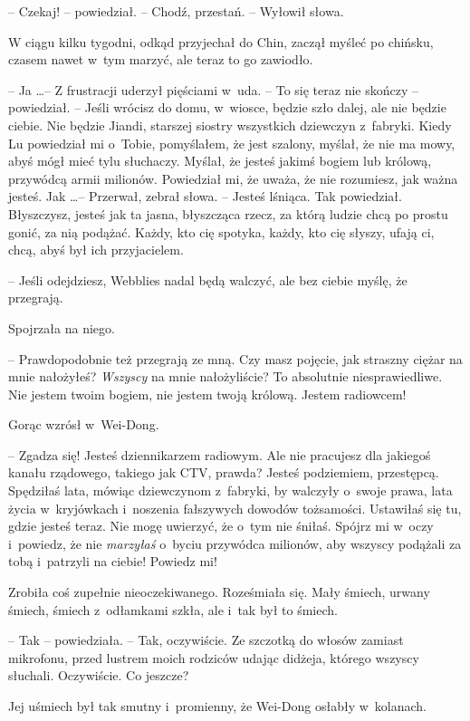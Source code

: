 \documentclass[oneside,polish,11pt,rmheadings]{mwbk}
\begin{document}
-- Czekaj! -- powiedział. -- Chodź, przestań. -- Wyłowił słowa. 

W ciągu kilku tygodni, odkąd przyjechał do Chin, zaczął myśleć po chińsku, czasem nawet w~tym marzyć, ale teraz to go zawiodło. 

-- Ja \ldots  -- Z frustracji uderzył pięściami w~uda. -- To się teraz nie skończy -- powiedział. -- Jeśli wrócisz do domu, w~wiosce, będzie szło dalej, ale nie będzie ciebie. Nie będzie Jiandi, starszej siostry wszystkich dziewczyn z~fabryki. Kiedy Lu powiedział mi o~Tobie, pomyślałem, że jest szalony, myślał, że nie ma mowy, abyś mógł mieć tylu słuchaczy. Myślał, że jesteś jakimś bogiem lub królową, przywódcą armii milionów. Powiedział mi, że uważa, że nie rozumiesz, jak ważna jesteś. Jak \ldots  -- Przerwał, zebrał słowa. -- Jesteś lśniąca. Tak powiedział. Błyszczysz, jesteś jak ta jasna, błyszcząca rzecz, za którą ludzie chcą po prostu gonić, za nią podążać. Każdy, kto cię spotyka, każdy, kto cię słyszy, ufają ci, chcą, abyś był ich przyjacielem.

-- Jeśli odejdziesz, Webblies nadal będą walczyć, ale bez ciebie myślę, że przegrają.

Spojrzała na niego. 

-- Prawdopodobnie też przegrają ze mną. Czy masz pojęcie, jak straszny ciężar na mnie nałożyłeś? \textit{Wszyscy }na mnie nałożyliście? To absolutnie niesprawiedliwe. Nie jestem twoim bogiem, nie jestem twoją królową. Jestem radiowcem!

Gorąc wzrósł w~Wei-Dong. 

-- Zgadza się! Jesteś dziennikarzem radiowym. Ale nie pracujesz dla jakiegoś kanału rządowego, takiego jak CTV, prawda? Jesteś podziemiem, przestępcą. Spędziłaś lata, mówiąc dziewczynom z~fabryki, by walczyły o~swoje prawa, lata życia w~kryjówkach i~noszenia fałszywych dowodów tożsamości. Ustawiłaś się tu, gdzie jesteś teraz. Nie mogę uwierzyć, że o~tym nie śniłaś. Spójrz mi w~oczy i~powiedz, że nie \textit{marzyłaś} o~byciu przywódca milionów, aby wszyscy podążali za tobą i~patrzyli na ciebie! Powiedz mi!

Zrobiła coś zupełnie nieoczekiwanego. Roześmiała się. Mały śmiech, urwany śmiech, śmiech z~odłamkami szkła, ale i~tak był to śmiech. 

-- Tak -- powiedziała. -- Tak, oczywiście. Ze szczotką do włosów zamiast mikrofonu, przed lustrem moich rodziców udając didżeja, którego wszyscy słuchali. Oczywiście. Co jeszcze?

Jej uśmiech był tak smutny i~promienny, że Wei-Dong osłabły w~kolanach. 
\end{document}

